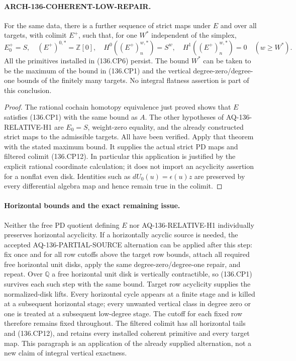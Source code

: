 \paragraph{ARCH-136-COHERENT-LOW-REPAIR.}
For the same data, there is a further sequence of strict maps
under \(E\) and over all targets, with colimit \(E^+\), such
that, for one \(W^*\) independent of the simplex,
\[
 E^+_0=S,\quad (E^+)^{0,*}=\mathbb Z[0],\quad
 H^0((E^+)_n^{w,*})=S^w,\quad
 H^1((E^+)_n^{w,*})=0\quad(w\geq W^*).                  \tag{136.CP12}
\]
All the primitives installed in (136.CP6) persist. The bound
\(W^*\) can be taken to be the maximum of the bound in
(136.CP1) and the vertical degree-zero/degree-one bounds of
the finitely many targets. No integral flatness assertion is
part of this conclusion.

\begin{proof}
The rational cochain homotopy equivalence just proved shows
that \(E\) satisfies (136.CP1) with the same bound as \(A\).
The other hypotheses of AQ-136-RELATIVE-H1 are \(E_0=S\),
weight-zero equality, and the already constructed strict maps
to the admissible targets. All have been verified. Apply that
theorem with the stated maximum bound. It supplies the actual
strict PD maps and filtered colimit (136.CP12). In particular
this application is justified by the explicit rational
coordinate calculation; it does not import an acyclicity
assertion for a nonflat even disk. Identities such as
\(dU_0(u)=\epsilon(u)z\) are preserved by every differential
algebra map and hence remain true in the colimit.
\end{proof}

\paragraph{Horizontal bounds and the exact remaining issue.}
Neither the free PD quotient defining \(E\) nor
AQ-136-RELATIVE-H1 individually preserves horizontal acyclicity.
If a horizontally acyclic source is needed, the accepted
AQ-136-PARTIAL-SOURCE alternation can be applied after this
step: fix once and for all row cutoffs above the target row
bounds, attach all required free horizontal unit disks, apply
the same degree-zero/degree-one repair, and repeat. Over
\(\mathbb Q\) a free horizontal unit disk is vertically
contractible, so (136.CP1) survives each such step with the
same bound. Target row acyclicity supplies the normalized-disk
lifts. Every horizontal cycle appears at a finite stage and
is killed at a subsequent horizontal stage; every unwanted
vertical class in degree zero or one is treated at a
subsequent low-degree stage. The cutoff for each fixed row
therefore remains fixed throughout. The filtered colimit has
all horizontal tails and (136.CP12), and retains every installed
coherent primitive and every target map. This paragraph is
an application of the already supplied alternation, not a new
claim of integral vertical exactness.

